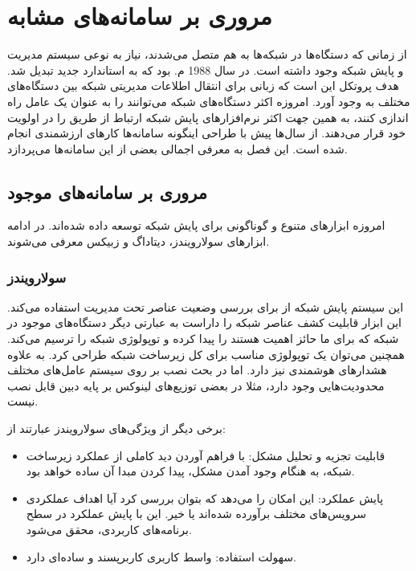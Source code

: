 \chapter{مروری بر سامانه‌های مشابه}

از زمانی که دستگاه‌ها در شبکه‌ها به هم متصل می‌شدند، نیاز به نوعی سیستم مدیریت و پایش شبکه وجود داشته است. در سال 1988 م. بود که  به استاندارد جدید تبدیل شد. هدف پروتکل  این است که زبانی برای انتقال اطلاعات مدیریتی شبکه بین دستگاه‌های مختلف به وجود آورد. امروزه اکثر دستگاه‌های شبکه می‌توانند  را به عنوان یک عامل راه اندازی کنند، به همین جهت اکثر نرم‌افزارهای پایش شبکه ارتباط از طریق  را در اولویت خود قرار می‌دهند.
از سال‌ها پیش با طراحی اینگونه سامانه‌ها کارهای ارزشمندی انجام شده است. این فصل به معرفی اجمالی بعضی از این سامانه‌ها می‌پردازد.

\section{مروری بر سامانه‌های موجود}

امروزه ابزارهای متنوع و گوناگونی برای پایش شبکه توسعه داده شده‌اند. در ادامه ابزارهای سولارویندز، دیتاداگ و زبیکس معرفی می‌شوند.



\subsection{سولارویندز}

این سیستم پایش شبکه از  برای بررسی وضعیت عناصر تحت مدیریت استفاده می‌کند. این ابزار قابلیت کشف عناصر شبکه را داراست به عبارتی دیگر دستگاه‌های موجود در شبکه که برای ما حائز اهمیت هستند را پیدا کرده و توپولوژی شبکه را ترسیم می‌کند. همچنین می‌توان یک توپولوژی مناسب برای کل زیرساخت شبکه طراحی کرد. به علاوه هشدارهای هوشمندی نیز دارد. اما در بحث نصب بر روی سیستم‌ عامل‌های مختلف محدودیت‌هایی وجود دارد، مثلا در بعضی توزیع‌های لینوکس بر پایه دبین قابل نصب نیست.

\newpage


برخی دیگر از ویژگی‌های سولارویندز عبارتند از:

\begin{itemize}
    \item قابلیت تجزیه و تحلیل مشکل: با فراهم آوردن دید کاملی از عملکرد زیرساخت شبکه، به هنگام وجود آمدن مشکل، پیدا کردن مبدا آن ساده خواهد بود.
    \item پایش عملکرد: این امکان را می‌دهد که بتوان بررسی کرد آیا اهداف عملکردی سرویس‌های مختلف برآورده شده‌اند یا خیر. این با پایش عملکرد در سطح برنامه‌های کاربردی، محقق می‌شود.
    \item سهولت استفاده: واسط کاربری کاربرپسند و ساده‌ای دارد.
\end{itemize}



